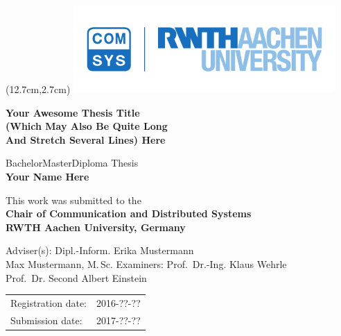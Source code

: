 
\titlehead{
} %


\begin{titlepage}

\begin{textblock*}{10cm} (12.7cm,2.7cm)
\includegraphics[width=10cm,keepaspectratio]{logos/rwth_comsys_bild_cmyk}
\end{textblock*}

\let\footnotesize\small \let\footnoterule\relax

\hbox{}
\vfill

\centering

\begin{doublespace} 
{ \huge\sffamily\textbf{Your Awesome Thesis Title \\ \vspace{-0.7em}
(Which May Also Be Quite Long \\ \vspace{0.2em}
And Stretch Several Lines) Here}}
\end{doublespace}
\vskip 2cm

{\large\sffamily

BachelorMasterDiploma Thesis\\[5pt]
\textbf{Your Name Here}
\vskip 1cm

This work was submitted to the\\[5pt]
\textbf{Chair of Communication and Distributed Systems\\[5pt]
        RWTH Aachen University, Germany}
\vskip 2cm

Adviser(s):
\vskip 2mm
Dipl.-Inform. Erika Mustermann\\
Max Mustermann, M.$\,$Sc.
\vskip 5mm
Examiners:
\vskip 2mm
Prof.~Dr.-Ing. Klaus Wehrle\\
Prof.~Dr. Second Albert Einstein
\vskip 1cm

\begin{tabular}{R{6cm}p{6cm}}
Registration date:  & 2016-??-?? \\
Submission date:    & 2017-??-?? \\
\end{tabular}

} %

\vfill

\end{titlepage}
